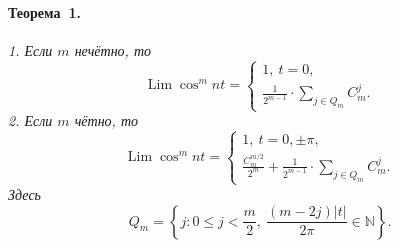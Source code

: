 \paragraph{Теорема~1.}
{\it
	1. Если $m$ нечётно, то \\[-3mm]
	$$
	\operatorname{Lim} \cos^m nt = \left\{
	\begin{array}{l}
		1, \ t = 0, \\[2mm]
		{\displaystyle \frac 1{2^{m - 1}} \cdot \sum_{j \in Q_m} C^j_m}.
	\end{array}
	\right.
	$$ 
	2. Если $m$ чётно, то \\[-3mm]
	$$
	\operatorname{Lim} \cos^m nt = \left\{
	\begin{array}{l}
		1, \ t = 0, \pm\pi, \\[2mm]
		{\displaystyle \frac{C^{m/2}_m}{2^m} +
		\frac 1{2^{m - 1}} \cdot \sum_{j \in Q_m} C^j_m}.
	\end{array}
	\right.
	$$
	Здесь \\[-3mm]
	$$
	Q_m = \left\{j: 0 \leqslant j < \frac m2, \ \frac{(m - 2j) |t|}{2\pi}
	\in \mathbb N\right\}.
	$$
}

